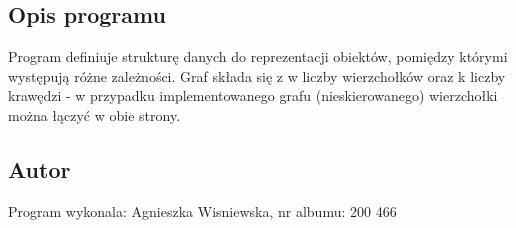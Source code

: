 \hypertarget{index_description}{}\subsection{Opis programu}\label{index_description}
Program definiuje strukturę danych do reprezentacji obiektów, pomiędzy którymi występują różne zależności. Graf składa się z w liczby wierzchołków oraz k liczby krawędzi -\/ w przypadku implementowanego grafu (nieskierowanego) wierzchołki można łączyć w obie strony.\hypertarget{index_author}{}\subsection{Autor}\label{index_author}
Program wykonala\-: Agnieszka Wisniewska, nr albumu\-: 200 466 